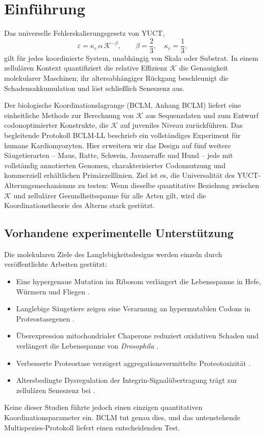 \documentclass[12pt,a4paper]{article}
\newcommand{\REL}{\mathcal{K}}          %
\begin{document}
	\tableofcontents
	\newpage
	
	\section{Einführung}
	\label{sec:intro}
	Das universelle Fehlerskalierungsgesetz von YUCT,
	\begin{equation}
		\varepsilon = \kappa_c \, \alpha \, \REL^{-\beta}, \qquad \beta = \frac{2}{3},\quad \kappa_c = \frac{1}{3},
		\label{eq:error-law}
	\end{equation}
	gilt für jedes koordinierte System, unabhängig von Skala oder Substrat. In einem zellulären Kontext quantifiziert die relative Effizienz \(\REL\) die Genauigkeit molekularer Maschinen; ihr altersabhängiger Rückgang beschleunigt die Schadensakkumulation und löst schließlich Seneszenz aus.
	
	Der biologische Koordinationslagrange (BCLM, Anhang BCLM) liefert eine einheitliche Methode zur Berechnung von \(\REL\) aus Sequenzdaten und zum Entwurf codonoptimierter Konstrukte, die \(\REL\) auf juveniles Niveau zurückführen. Das begleitende Protokoll BCLM‑LL beschrieb ein vollständiges Experiment für humane Kardiomyozyten. Hier erweitern wir das Design auf fünf weitere Säugetierarten – Maus, Ratte, Schwein, Javaneraffe und Hund – jede mit vollständig annotierten Genomen, charakterisierter Codonnutzung und kommerziell erhältlichen Primärzelllinien. Ziel ist es, die Universalität des YUCT-Alterungsmechanismus zu testen: Wenn dieselbe quantitative Beziehung zwischen \(\REL\) und zellulärer Gesundheitsspanne für alle Arten gilt, wird die Koordinationstheorie des Alterns stark gestützt.
	
	\subsection{Vorhandene experimentelle Unterstützung}
	Die molekularen Ziele des Langlebigkeitsdesigns werden einzeln durch veröffentlichte Arbeiten gestützt:
	\begin{itemize}
		\item Eine hypergenaue Mutation im Ribosom verlängert die Lebensspanne in Hefe, Würmern und Fliegen \cite{Bjedov2021}.
		\item Langlebige Säugetiere zeigen eine Verarmung an hypermutablen Codons in Proteostasegenen \cite{Kerekes2025}.
		\item Überexpression mitochondrialer Chaperone reduziert oxidativen Schaden und verlängert die Lebensspanne von \textit{Drosophila} \cite{Morrow2004}.
		\item Verbesserte Proteostase verzögert aggregationsvermittelte Proteotoxizität \cite{Walker2003}.
		\item Altersbedingte Dysregulation der Integrin-Signalübertragung trägt zur zellulären Seneszenz bei \cite{Takeda2019}.
	\end{itemize}
	Keine dieser Studien führte jedoch einen einzigen quantitativen Koordinationsparameter ein. BCLM tut genau dies, und das untenstehende Multispezies-Protokoll liefert einen entscheidenden Test.
	
\end{document}
